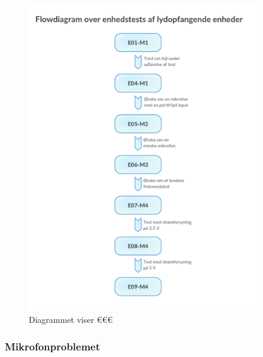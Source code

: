 \begin{figure}[htb]
			\centering
				\includegraphics[width=4in]{flowdiagrameop}
				\caption{Diagrammet viser €€€}	
				\label{fig:flowdiagrameop}
			\end{figure}

\subsubsection{Mikrofonproblemet}

